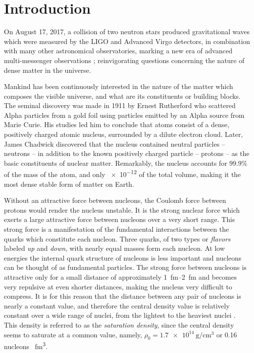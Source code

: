\chapter{Introduction}
On August 17, 2017, a collision of two neutron stars produced gravitational waves which were measured by the LIGO and Advanced Virgo detectors, in combination with many other astronomical observatories, marking a new era of advanced multi-messenger observations \cite{ns_2017}; reinvigorating questions concerning the nature of dense matter in the universe.

Mankind has been continuously interested in the nature of the matter which composes the visible universe, and what are its constituents or building blocks. The seminal discovery was made in 1911 by Ernest Rutherford who scattered Alpha particles from a gold foil using particles emitted by an Alpha source from Marie Curie. His studies led him to conclude that atoms consist of a dense, positively charged atomic nucleus, surrounded by a dilute electron cloud. Later,  James Chadwick  discovered that the nucleus contained neutral particles -- neutrons  -- in addition to the known positively charged particle -- protons -- as the basic constituents of nuclear matter. Remarkably, the nucleus accounts for 99.9\% of the mass of the atom, and only \num{e-12} of the total volume, making it the most dense stable form of matter on Earth. 

Without an attractive force between nucleons, the Coulomb force between protons would render the nucleus unstable. It is the strong nuclear force which exerts a large attractive force  between nucleons over a very short range. This strong force is a manifestation of the fundamental interactions between the quarks which constitute each nucleon. Three quarks, of two types or \emph{flavors} labeled \emph{up} and \emph{down}, with nearly equal masses form each nucleon. At low energies the internal quark structure of nucleons is less important and nucleons can be thought of as fundamental particles. The strong force between nucleons is attractive only for a small distance of approximately \SIrange{1}{2}{\femto\metre} and becomes very repulsive at even shorter distances, making the nucleus very difficult to compress. It is for this reason that the distance between any pair of nucleons is nearly a constant value, and therefore the central density value is relatively constant over a wide range of nuclei, from the lightest to the heaviest nuclei \cite{krane}. This density is referred to as the  \emph{saturation density}, since the central density seems to saturate at a common value, namely, $\rho_0 = \SI{1.7e14}{\gram\per\centi\metre\cubed}$ or \num{0.16} nucleons \si{\per\femto\metre\cubed}.  

